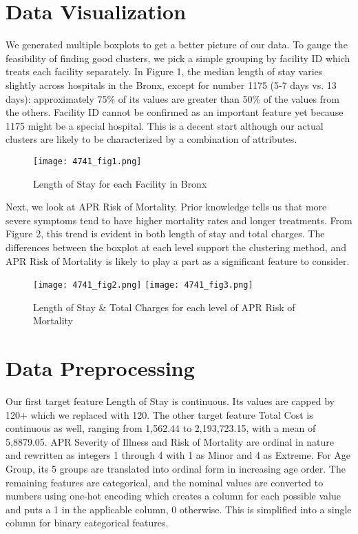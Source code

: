 \documentclass{article}
\begin{document}
\section{Data Visualization}
We generated multiple boxplots to get a better picture of our data. To gauge the feasibility of finding good clusters, we pick a simple grouping by facility ID which treats each facility separately. In Figure 1, the median length of stay varies slightly across hospitals in the Bronx, except for number 1175 (5-7 days vs. 13 days): approximately 75\% of its values are greater than 50\% of the values from the others. Facility ID cannot be confirmed as an important feature yet because 1175 might be a special hospital. This is a decent start although our actual clusters are likely to be characterized by a combination of attributes.
\begin{figure}[H]
    \centering
    \texttt{[image: 4741\_fig1.png]}
    \caption{Length of Stay for each Facility in Bronx}
\end{figure}
\noindent
Next, we look at APR Risk of Mortality. Prior knowledge tells us that more severe symptoms tend to have higher mortality rates and longer treatments. From Figure 2, this trend is evident in both length of stay and total charges. The differences between the boxplot at each level support the clustering method, and APR Risk of Mortality is likely to play a part as a significant feature to consider.
\begin{figure}[H]
    \centering
    \texttt{[image: 4741\_fig2.png]}
    \texttt{[image: 4741\_fig3.png]}
    \caption{Length of Stay \& Total Charges for each level of APR Risk of Mortality }
\end{figure}
\noindent

\section{Data Preprocessing}
Our first target feature Length of Stay is continuous. Its values are capped by 120+ which we replaced with 120. The other target feature Total Cost is continuous as well, ranging from 1,562.44 to 2,193,723.15, with a mean of 5,8879.05. APR Severity of Illness and Risk of Mortality are ordinal in nature and rewritten as integers 1 through 4 with 1 as Minor and 4 as Extreme. For Age Group, its 5 groups are translated into ordinal form in increasing age order. The remaining features are categorical, and the nominal values are converted to numbers using one-hot encoding which creates a column for each possible value and puts a 1 in the applicable column, 0 otherwise. This is simplified into a single column for binary categorical features.
\newline
\end{document}
